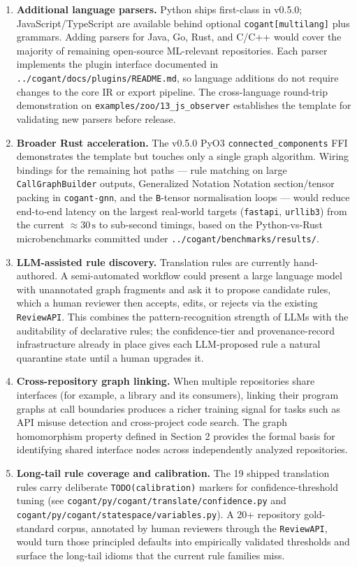 \documentclass[
]{article}
\begin{document}
\begin{enumerate}
\def\labelenumi{\arabic{enumi}.}
\item
  \textbf{Additional language parsers.} Python ships first-class in
  v0.5.0; JavaScript/TypeScript are available behind optional
  \texttt{cogant{[}multilang{]}} plus grammars. Adding parsers for Java,
  Go, Rust, and C/C++ would cover the majority of remaining open-source
  ML-relevant repositories. Each parser implements the plugin interface
  documented in \texttt{../cogant/docs/plugins/README.md}, so language
  additions do not require changes to the core IR or export pipeline.
  The cross-language round-trip demonstration on
  \texttt{examples/zoo/13\_js\_observer} establishes the template for
  validating new parsers before release.
\item
  \textbf{Broader Rust acceleration.} The v0.5.0 PyO3
  \texttt{connected\_components} FFI demonstrates the template but
  touches only a single graph algorithm. Wiring bindings for the
  remaining hot paths --- rule matching on large
  \texttt{CallGraphBuilder} outputs, Generalized Notation Notation
  section/tensor packing in \texttt{cogant-gnn}, and the
  \texttt{B}-tensor normalisation loops --- would reduce end-to-end
  latency on the largest real-world targets (\texttt{fastapi},
  \texttt{urllib3}) from the current \(\approx 30\,\text{s}\) to
  sub-second timings, based on the Python-vs-Rust microbenchmarks
  committed under \texttt{../cogant/benchmarks/results/}.
\item
  \textbf{LLM-assisted rule discovery.} Translation rules are currently
  hand-authored. A semi-automated workflow could present a large
  language model with unannotated graph fragments and ask it to propose
  candidate rules, which a human reviewer then accepts, edits, or
  rejects via the existing \texttt{ReviewAPI}. This combines the
  pattern-recognition strength of LLMs with the auditability of
  declarative rules; the confidence-tier and provenance-record
  infrastructure already in place gives each LLM-proposed rule a natural
  quarantine state until a human upgrades it.
\item
  \textbf{Cross-repository graph linking.} When multiple repositories
  share interfaces (for example, a library and its consumers), linking
  their program graphs at call boundaries produces a richer training
  signal for tasks such as API misuse detection and cross-project code
  search. The graph homomorphism property defined in Section 2 provides
  the formal basis for identifying shared interface nodes across
  independently analyzed repositories.
\item
  \textbf{Long-tail rule coverage and calibration.} The 19 shipped
  translation rules carry deliberate \texttt{TODO(calibration)} markers
  for confidence-threshold tuning (see
  \texttt{cogant/py/cogant/translate/confidence.py} and
  \texttt{cogant/py/cogant/statespace/variables.py}). A 20+ repository
  gold-standard corpus, annotated by human reviewers through the
  \texttt{ReviewAPI}, would turn those principled defaults into
  empirically validated thresholds and surface the long-tail idioms that
  the current rule families miss.
\end{enumerate}
\end{document}
